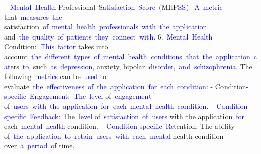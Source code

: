 \begin{tcolorbox}[colframe=gray!70!black,colback=white, title=Sample 6]
{}\textcolor{blue}{-}\textcolor{blue}{~Mental}\textcolor{blue}{~Health} Professional\textcolor{blue}{~Satisfaction}\textcolor{blue}{~Score}\textcolor{blue}{~(}MHP\textcolor{blue}{SS}\textcolor{blue}{):}\textcolor{blue}{~A}\textcolor{blue}{~metric} that\textcolor{blue}{~measures}\textcolor{blue}{~the} satisfaction\textcolor{blue}{~of}\textcolor{blue}{~mental}\textcolor{blue}{~health}\textcolor{blue}{~professionals}\textcolor{blue}{~with}\textcolor{blue}{~the}\textcolor{blue}{~application} and\textcolor{blue}{~the}\textcolor{blue}{~quality}\textcolor{blue}{~of}\textcolor{blue}{~patients}\textcolor{blue}{~they}\textcolor{blue}{~connect}\textcolor{blue}{~with}\textcolor{blue}{.
}6.\textcolor{blue}{~Mental}\textcolor{blue}{~Health} Condition:\textcolor{blue}{~This}\textcolor{blue}{~factor} takes into account\textcolor{blue}{~the}\textcolor{blue}{~different}\textcolor{blue}{~types}\textcolor{blue}{~of}\textcolor{blue}{~mental}\textcolor{blue}{~health}\textcolor{blue}{~conditions}\textcolor{blue}{~that}\textcolor{blue}{~the}\textcolor{blue}{~application}\textcolor{blue}{~cat}ers\textcolor{blue}{~to}, such\textcolor{blue}{~as}\textcolor{blue}{~depression}\textcolor{blue}{,} anxiety\textcolor{blue}{,} bipolar\textcolor{blue}{~disorder}\textcolor{blue}{,}\textcolor{blue}{~and}\textcolor{blue}{~schizophrenia}\textcolor{blue}{.} The following\textcolor{blue}{~metrics} can be\textcolor{blue}{~used} to evaluate\textcolor{blue}{~the}\textcolor{blue}{~effectiveness}\textcolor{blue}{~of}\textcolor{blue}{~the}\textcolor{blue}{~application}\textcolor{blue}{~for}\textcolor{blue}{~each}\textcolor{blue}{~condition}\textcolor{blue}{:
}\textcolor{blue}{-} Condition\textcolor{blue}{-specific}\textcolor{blue}{~Engagement}\textcolor{blue}{:}\textcolor{blue}{~The}\textcolor{blue}{~level} of\textcolor{blue}{~engagement} of\textcolor{blue}{~users}\textcolor{blue}{~with}\textcolor{blue}{~the}\textcolor{blue}{~application}\textcolor{blue}{~for}\textcolor{blue}{~each}\textcolor{blue}{~mental}\textcolor{blue}{~health}\textcolor{blue}{~condition}\textcolor{blue}{.
}\textcolor{blue}{-}\textcolor{blue}{~Condition}\textcolor{blue}{-specific}\textcolor{blue}{~Feedback}\textcolor{blue}{:} The\textcolor{blue}{~level} of\textcolor{blue}{~satisfaction}\textcolor{blue}{~of}\textcolor{blue}{~users} with the application\textcolor{blue}{~for} each\textcolor{blue}{~mental}\textcolor{blue}{~health} condition\textcolor{blue}{.
}\textcolor{blue}{-}\textcolor{blue}{~Condition}\textcolor{blue}{-specific}\textcolor{blue}{~Ret}ention\textcolor{blue}{:} The ability of\textcolor{blue}{~the}\textcolor{blue}{~application}\textcolor{blue}{~to}\textcolor{blue}{~retain}\textcolor{blue}{~users}\textcolor{blue}{~with}\textcolor{blue}{~each}\textcolor{blue}{~mental} health condition over\textcolor{blue}{~a}\textcolor{blue}{~period}\textcolor{blue}{~of} time\textcolor{blue}{.
}
\end{tcolorbox}
